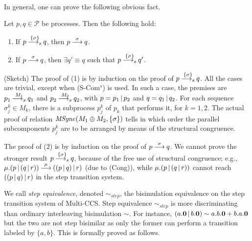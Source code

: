 %
%

In general, one can prove the following obvious fact.

\begin{proposition}\label{step>int}
Let $p, q \in {\mathcal P}$ be processes. Then the following hold:
\begin{enumerate}
\item If $p {\mbox{${\:\stackrel{\{\sigma\}}{\longrightarrow_s}\:}$}} q$, then $p {\mbox{${\:\stackrel{\sigma}{\longrightarrow}\:}$}} q$.
\item If $p {\mbox{${\:\stackrel{\sigma}{\longrightarrow}\:}$}} q$, then $\exists q' \equiv q$ such that $p {\mbox{${\:\stackrel{\{\sigma\}}{\longrightarrow_s}\:}$}} q'$.
\end{enumerate}

\proof (Sketch) The proof of (1) is by induction on the proof of $p {\mbox{${\:\stackrel{\{\sigma\}}{\longrightarrow_s}\:}$}} q$. All the cases are trivial,
except when (S-Com$^s$) is used. In such a case, 
the premises are $p_1 {\mbox{${\:\stackrel{M_1}{\longrightarrow_s}\:}$}} q_1$ and $p_2 {\mbox{${\:\stackrel{M_2}{\longrightarrow_s}\:}$}} q_2$, with $p = p_1 \mbox{$\,|\,$} p_2$ and
$q = q_1 \mbox{$\,|\,$} q_2$. For each sequence $\sigma_j^k \in M_k$, there is a subprocess $p_j^k$ of $p_k$ that 
performs it, for $k = 1, 2$.
The actual proof of relation $\mathit{MSync}(M_1 \oplus M_2, \{\sigma\})$ tells in which order the parallel 
subcomponents $p_j^k$ are to be arranged by means of the structural congruence.

The proof of (2) is by induction on the proof of $p {\mbox{${\:\stackrel{\sigma}{\longrightarrow}\:}$}} q$. We cannot prove the
stronger result $p {\mbox{${\:\stackrel{\{\sigma\}}{\longrightarrow_s}\:}$}} q$, because of the free use of structural congruence; e.g., 
$\mu.(p \mbox{$\,|\,$} (q \mbox{$\,|\,$} r)) {\mbox{${\:\stackrel{\mu}{\longrightarrow}\:}$}} ((p \mbox{$\,|\,$} q) \mbox{$\,|\,$} r)$ (due to (Cong)), 
while $\mu.(p \mbox{$\,|\,$} (q \mbox{$\,|\,$} r))$ cannot reach $((p \mbox{$\,|\,$} q) \mbox{$\,|\,$} r)$ in the step transition system.
\fine
\end{proposition}



We call {\em step equivalence}, denoted $\sim_{step}$, the bisimulation equivalence on the step transition 
system of Multi-CCS. Step equivalence $\sim_{step}$ is more discriminating than ordinary interleaving bisimulation $\sim$. 
For instance, $(a.\mbox{\bf 0} \mbox{$\,|\,$} b.\mbox{\bf 0}) \sim a.b.\mbox{\bf 0} + b.a.\mbox{\bf 0}$
but the two are not step bisimilar as only the former can perform a transition labeled by $\{a, b\}$.
This is formally proved as follows.

